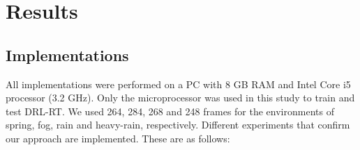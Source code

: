 \documentclass{svproc}
\begin{document}
	\section{Results}
	\subsection{Implementations}
		All implementations were performed on a PC with 8 GB RAM and Intel Core i5 processor (3.2 GHz). Only the microprocessor was used in this study to train and test DRL-RT. We used 264, 284, 268 and 248 frames for the environments of spring, fog, rain and heavy-rain, respectively. Different experiments that confirm our approach are implemented. These are as follows:
	
\end{document}
